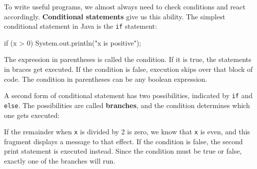 \documentclass[12pt]{book}
\theoremstyle{exercise}
\newcommand{\java}[1]{\verb"#1"}
\begin{document}
To write useful programs, we almost always need to check conditions and react accordingly.
{\bf Conditional statements} give us this ability.
The simplest conditional statement in Java is the \java{if} statement:

\begin{code}
    if (x > 0) {
        System.out.println("x is positive");
    }
\end{code}

The expression in parentheses is called the condition.
If it is true, the statements in braces get executed.
If the condition is false, execution skips over that block of code.
The condition in parentheses can be any boolean expression.


A second form of conditional statement has two possibilities, indicated by \java{if} and \java{else}.
The possibilities are called {\bf branches}, and the condition determines which one gets executed:


If the remainder when \java{x} is divided by 2 is zero, we know that \java{x} is even, and this fragment displays a message to that effect.
If the condition is false, the second print statement is executed instead.
Since the condition must be true or false, exactly one of the branches will run.

%
%
%
%
%
%
\end{document}
